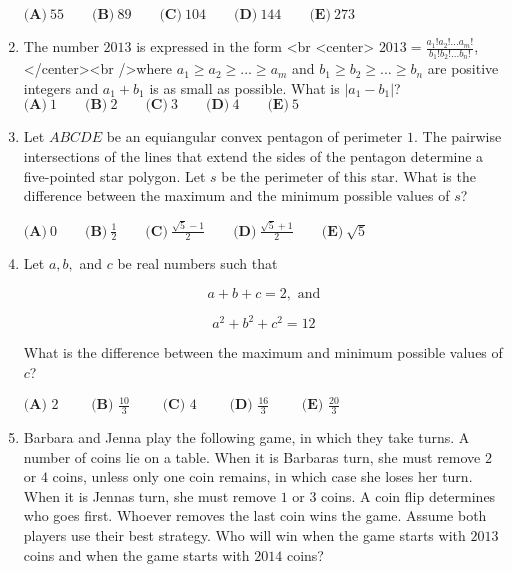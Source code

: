 \documentclass{article}
\begin{document}
\begin{enumerate}[label=\arabic*., itemsep=0.5em]
\(\textbf{(A)}\ 55 \qquad \textbf{(B)}\ 89 \qquad \textbf{(C)}\ 104 \qquad \textbf{(D)}\ 144 \qquad \textbf{(E)}\ 273\)\par \vspace{0.5em}\item The number \(2013\) is expressed in the form <br \> <center> \(2013 = \frac {a_1!a_2!...a_m!}{b_1!b_2!...b_n!}\),</center><br />where \(a_1 \ge a_2 \ge ... \ge a_m\) and \(b_1 \ge b_2 \ge ... \ge b_n\) are positive integers and \(a_1 + b_1\) is as small as possible. What is \(|a_1 - b_1|\)?
\(\textbf{(A)}\ 1 \qquad \textbf{(B)}\ 2 \qquad \textbf{(C)}\ 3 \qquad \textbf{(D)}\ 4 \qquad \textbf{(E)}\ 5\)\par \vspace{0.5em}\item Let \(ABCDE\) be an equiangular convex pentagon of perimeter \(1\). The pairwise intersections of the lines that extend the sides of the pentagon determine a five-pointed star polygon. Let \(s\) be the perimeter of this star. What is the difference between the maximum and the minimum possible values of \(s\)?

\(\textbf{(A)}\ 0 \qquad \textbf{(B)}\ \frac{1}{2} \qquad \textbf{(C)}\ \frac{\sqrt{5}-1}{2} \qquad \textbf{(D)}\  \frac{\sqrt{5}+1}{2} \qquad \textbf{(E)}\ \sqrt{5}\)\par \vspace{0.5em}\item Let \(a,b,\) and \(c\) be real numbers such that 


\begin{equation*}
a+b+c=2, \text{ and}
\end{equation*}


\begin{equation*}
a^2+b^2+c^2=12
\end{equation*}


What is the difference between the maximum and minimum possible values of \(c\)?

\( \textbf{(A) }2\qquad \textbf{ (B) }\frac{10}{3}\qquad \textbf{ (C) }4 \qquad \textbf{ (D) }\frac{16}{3}\qquad \textbf{ (E) }\frac{20}{3} \)\par \vspace{0.5em}\item Barbara and Jenna play the following game, in which they take turns. A number of coins lie on a table. When it is Barbaras turn, she must remove \(2\) or \(4\) coins, unless only one coin remains, in which case she loses her turn. When it is Jennas turn, she must remove \(1\) or \(3\) coins. A coin flip determines who goes first. Whoever removes the last coin wins the game. Assume both players use their best strategy. Who will win when the game starts with \(2013\) coins and when the game starts with \(2014\) coins?


\end{enumerate}
\end{document}
